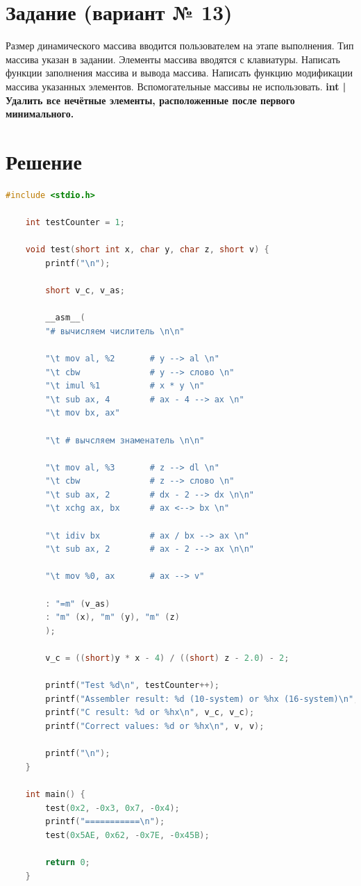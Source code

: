 \documentclass[12pt]{article}
\begin{document}
	\newpage
	
	
	\section*{Задание (вариант № 13)}
	
 	Размер динамического массива вводится пользователем на этапе выполнения. Тип массива указан в задании. Элементы массива вводятся с клавиатуры. Написать функции заполнения массива и вывода массива. Написать функцию модификации массива указанных элементов. Вспомогательные массивы не использовать.	
 	\vspace{5pt}
	\newline
	\textbf{int | Удалить все нечётные элементы, расположенные после первого минимального.}
	
	\newpage
	
	\section*{Решение}
	
	\begin{lstlisting}[language=C]
	#include <stdio.h>
	
	int testCounter = 1;
	
	void test(short int x, char y, char z, short v) {
		printf("\n");
		
		short v_c, v_as;
		
		__asm__(
		"# вычисляем числитель \n\n"
		
		"\t mov al, %2       # y --> al \n"
		"\t cbw              # y --> слово \n"
		"\t imul %1          # x * y \n"
		"\t sub ax, 4        # ax - 4 --> ax \n"
		"\t mov bx, ax"
		
		"\t # вычсляем знаменатель \n\n"
		
		"\t mov al, %3       # z --> dl \n"
		"\t cbw              # z --> слово \n"
		"\t sub ax, 2        # dx - 2 --> dx \n\n"
		"\t xchg ax, bx      # ax <--> bx \n"
		
		"\t idiv bx          # ax / bx --> ax \n"
		"\t sub ax, 2        # ax - 2 --> ax \n\n"
		
		"\t mov %0, ax       # ax --> v"
		
		: "=m" (v_as)                
		: "m" (x), "m" (y), "m" (z)  
		);
		
		v_c = ((short)y * x - 4) / ((short) z - 2.0) - 2;
		
		printf("Test %d\n", testCounter++);
		printf("Assembler result: %d (10-system) or %hx (16-system)\n", v_as, v_as);
		printf("C result: %d or %hx\n", v_c, v_c);
		printf("Correct values: %d or %hx\n", v, v);
		
		printf("\n");
	}
	
	int main() {
		test(0x2, -0x3, 0x7, -0x4);
		printf("===========\n");
		test(0x5AE, 0x62, -0x7E, -0x45B);
		
		return 0;
	}
	\end{lstlisting}
	
\end{document}
